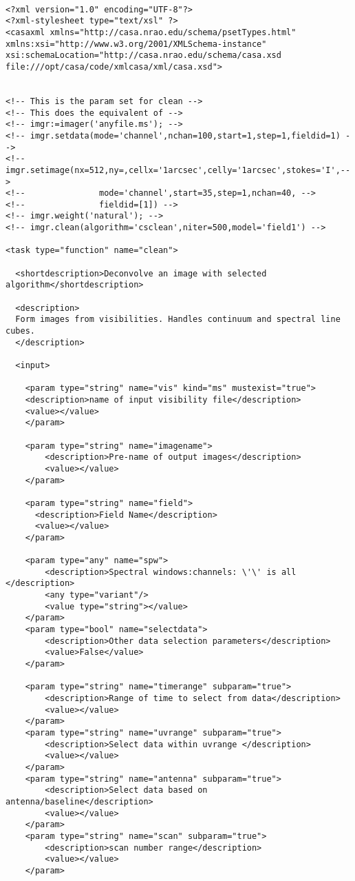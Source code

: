 \begin{verbatim}

<?xml version="1.0" encoding="UTF-8"?>
<?xml-stylesheet type="text/xsl" ?>
<casaxml xmlns="http://casa.nrao.edu/schema/psetTypes.html"
xmlns:xsi="http://www.w3.org/2001/XMLSchema-instance"
xsi:schemaLocation="http://casa.nrao.edu/schema/casa.xsd
file:///opt/casa/code/xmlcasa/xml/casa.xsd">


<!-- This is the param set for clean -->
<!-- This does the equivalent of -->
<!-- imgr:=imager('anyfile.ms'); -->
<!-- imgr.setdata(mode='channel',nchan=100,start=1,step=1,fieldid=1) -->
<!-- imgr.setimage(nx=512,ny=,cellx='1arcsec',celly='1arcsec',stokes='I',-->
<!--               mode='channel',start=35,step=1,nchan=40, -->
<!--               fieldid=[1]) -->
<!-- imgr.weight('natural'); -->
<!-- imgr.clean(algorithm='csclean',niter=500,model='field1') -->

<task type="function" name="clean">

  <shortdescription>Deconvolve an image with selected algorithm</shortdescription>

  <description>
  Form images from visibilities. Handles continuum and spectral line cubes.
  </description>

  <input>

    <param type="string" name="vis" kind="ms" mustexist="true">
    <description>name of input visibility file</description>
    <value></value>
    </param>

    <param type="string" name="imagename">
	    <description>Pre-name of output images</description>
	    <value></value>
    </param>

    <param type="string" name="field">
      <description>Field Name</description>
      <value></value>
    </param>

    <param type="any" name="spw">
	    <description>Spectral windows:channels: \'\' is all </description>
	    <any type="variant"/>
	    <value type="string"></value>
    </param>
    <param type="bool" name="selectdata">
	    <description>Other data selection parameters</description>
	    <value>False</value>
    </param>
    
    <param type="string" name="timerange" subparam="true">
	    <description>Range of time to select from data</description>
	    <value></value>
    </param>
    <param type="string" name="uvrange" subparam="true">
	    <description>Select data within uvrange </description>
	    <value></value>
    </param>
    <param type="string" name="antenna" subparam="true">
	    <description>Select data based on antenna/baseline</description>
	    <value></value>
    </param>
    <param type="string" name="scan" subparam="true">
	    <description>scan number range</description>
	    <value></value>
    </param>
    


\end{verbatim}
